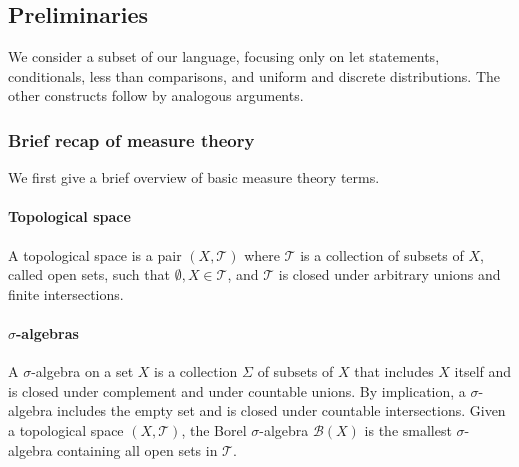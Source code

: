 %
%
%

\newpage
\subsection{Preliminaries}
We consider a subset of our language, focusing only on let statements, conditionals, less than comparisons, and uniform and discrete distributions. The other constructs follow by analogous arguments.


\subsubsection{Brief recap of measure theory} 
We first give a brief overview of basic measure theory terms.

\paragraph{Topological space} A topological space is a pair $(X, \mathcal{T})$ where $\mathcal{T}$ is a collection of subsets of $X$, called open sets, such that $\emptyset, X \in \mathcal{T}$, and $\mathcal{T}$ is closed under arbitrary unions and finite intersections.

\paragraph{$\sigma$-algebras} A $\sigma$-algebra on a set $X$ is a collection $\Sigma$ of subsets of $X$ that includes $X$ itself and is closed under complement and under countable unions. By implication, a $\sigma$-algebra includes the empty set and is closed under countable intersections. 
Given a topological space $(X, \mathcal{T})$, the Borel $\sigma$-algebra $\mathcal{B}(X)$ is the smallest $\sigma$-algebra containing all open sets in $\mathcal{T}$.

